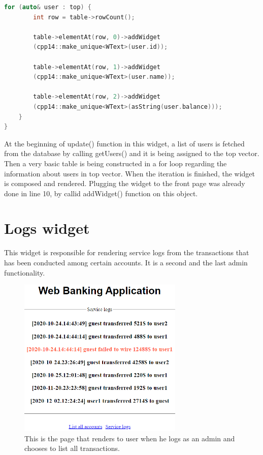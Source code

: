 \documentclass[a4paper,12pt]{book}
\begin{document}
{{\begin{lstlisting}[frame=single, basicstyle=\small, language=C++, caption={ListAccountsWidget::update() function.}, captionpos=b]
    for (auto& user : top) {
        int row = table->rowCount();

        table->elementAt(row, 0)->addWidget
        (cpp14::make_unique<WText>(user.id));
        
        table->elementAt(row, 1)->addWidget
        (cpp14::make_unique<WText>(user.name));
        
        table->elementAt(row, 2)->addWidget
        (cpp14::make_unique<WText>(asString(user.balance)));
    }
}
\end{lstlisting}

At the beginning of update() function in this widget, a list of users is fetched from the database by calling getUsers() and it is being assigned to the top vector. Then a very basic table is being constructed in a for loop regarding the information about users in top vector. When the iteration is finished, the widget is composed and rendered. Plugging the widget to the front page was already done in line 10, by callid addWidget() function on this object.
}

\section*{Logs widget}
{
This widget is responsible for rendering service logs from the transactions that has been conducted among certain accounts. It is a second and the last admin functionality.

\begin{figure}[H]
\centering
\includegraphics[width=0.7\textwidth]{servicelogs}
\caption{This is the page that renders to user when he logs as an admin and chooses to list all transactions.}
\end{figure}

}}
\end{document}
